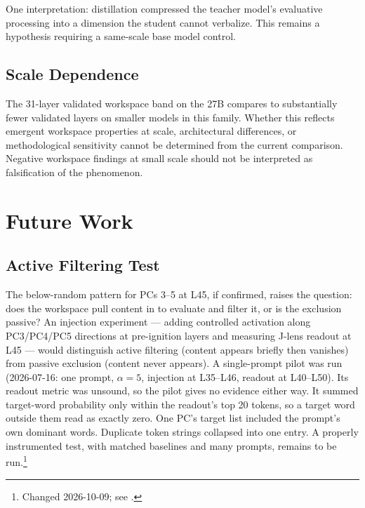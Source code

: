 \documentclass[11pt,a4paper]{article}
\begin{document}
One interpretation: distillation compressed the teacher model's evaluative processing into a dimension the student cannot verbalize. This remains a hypothesis requiring a same-scale base model control.

\subsection{Scale Dependence}

The 31-layer validated workspace band on the 27B compares to substantially fewer validated layers on smaller models in this family. Whether this reflects emergent workspace properties at scale, architectural differences, or methodological sensitivity cannot be determined from the current comparison. Negative workspace findings at small scale should not be interpreted as falsification of the phenomenon.

\section{Future Work}

\subsection{Active Filtering Test}
\label{sec:active-filtering}

The below-random pattern for PCs 3--5 at L45, if confirmed, raises the question: does the workspace pull content in to evaluate and filter it, or is the exclusion passive? An injection experiment --- adding controlled activation along PC3/PC4/PC5 directions at pre-ignition layers and measuring J-lens readout at L45 --- would distinguish active filtering (content appears briefly then vanishes) from passive exclusion (content never appears). A single-prompt pilot was run (2026-07-16: one prompt, $\alpha = 5$, injection at L35--L46, readout at L40--L50). Its readout metric was unsound, so the pilot gives no evidence either way. It summed target-word probability only within the readout's top 20 tokens, so a target word outside them read as exactly zero. One PC's target list included the prompt's own dominant words. Duplicate token strings collapsed into one entry. A properly instrumented test, with matched baselines and many prompts, remains to be run.\footnote{Changed 2026-10-09; see .}
\end{document}
